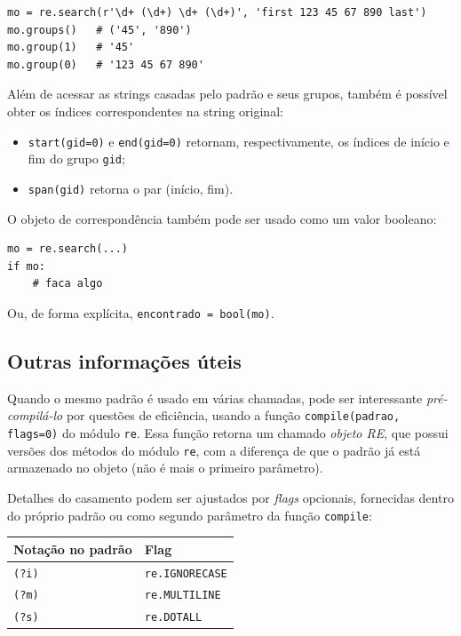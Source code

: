 \documentclass[11pt,a4paper]{article}
\begin{document}
\begin{lstlisting}
mo = re.search(r'\d+ (\d+) \d+ (\d+)', 'first 123 45 67 890 last')
mo.groups()   # ('45', '890')
mo.group(1)   # '45'
mo.group(0)   # '123 45 67 890'
\end{lstlisting}

Além de acessar as strings casadas pelo padrão e seus grupos, também é
possível obter os índices correspondentes na string original:

\begin{itemize}
\item \texttt{start(gid=0)} e \texttt{end(gid=0)} retornam, respectivamente, os índices de início e fim do grupo \texttt{gid};
\item \texttt{span(gid)} retorna o par (início, fim).
\end{itemize}

O objeto de correspondência também pode ser usado como um valor booleano:

\begin{lstlisting}
mo = re.search(...)
if mo:
    # faca algo
\end{lstlisting}

Ou, de forma explícita, \texttt{encontrado = bool(mo)}.

\subsection{Outras informações úteis}

Quando o mesmo padrão é usado em várias chamadas, pode ser interessante
\emph{pré-compilá-lo} por questões de eficiência, usando a função
\texttt{compile(padrao, flags=0)} do módulo \texttt{re}. Essa função
retorna um chamado \emph{objeto RE}, que possui versões dos métodos do
módulo \texttt{re}, com a diferença de que o padrão já está armazenado no
objeto (não é mais o primeiro parâmetro).

Detalhes do casamento podem ser ajustados por \emph{flags} opcionais,
fornecidas dentro do próprio padrão ou como segundo parâmetro da função
\texttt{compile}:

\begin{center}
\begin{tabular}{ll}
\toprule
\textbf{Notação no padrão} & \textbf{Flag} \\
\midrule
\texttt{(?i)} & \texttt{re.IGNORECASE} \\
\texttt{(?m)} & \texttt{re.MULTILINE} \\
\texttt{(?s)} & \texttt{re.DOTALL} \\
\bottomrule
\end{tabular}
\end{center}
\end{document}
